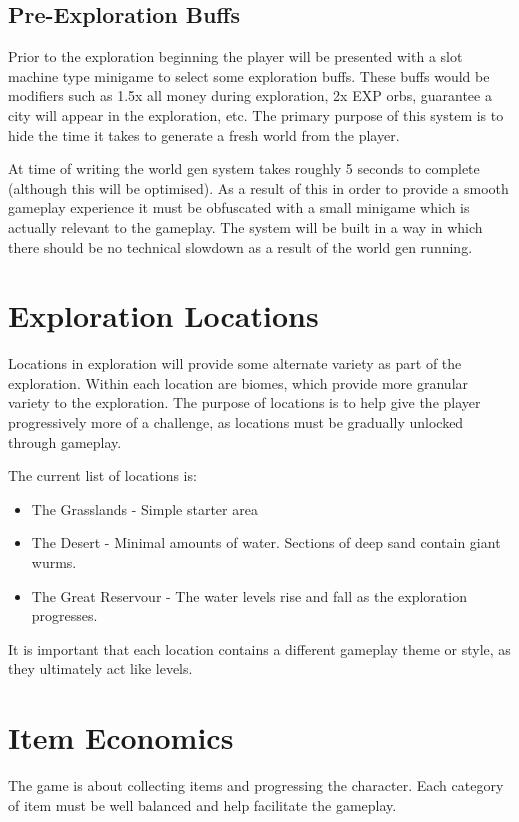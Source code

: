 \documentclass[a4paper]{scrreprt}
\begin{document}
\subsection{Pre-Exploration Buffs}
Prior to the exploration beginning the player will be presented with a slot machine type minigame to select some exploration buffs.
These buffs would be modifiers such as 1.5x all money during exploration, 2x EXP orbs, guarantee a city will appear in the exploration, etc.
The primary purpose of this system is to hide the time it takes to generate a fresh world from the player.

At time of writing the world gen system takes roughly 5 seconds to complete (although this will be optimised).
As a result of this in order to provide a smooth gameplay experience it must be obfuscated with a small minigame which is actually relevant to the gameplay.
The system will be built in a way in which there should be no technical slowdown as a result of the world gen running.

\section{Exploration Locations}
Locations in exploration will provide some alternate variety as part of the exploration.
Within each location are biomes, which provide more granular variety to the exploration.
The purpose of locations is to help give the player progressively more of a challenge, as locations must be gradually unlocked through gameplay.

The current list of locations is:

    \begin{itemize}
        \item The Grasslands - Simple starter area
        \item The Desert - Minimal amounts of water. Sections of deep sand contain giant wurms.
        \item The Great Reservour - The water levels rise and fall as the exploration progresses.
    \end{itemize}

It is important that each location contains a different gameplay theme or style, as they ultimately act like levels.

\section{Item Economics}
The game is about collecting items and progressing the character.
Each category of item must be well balanced and help facilitate the gameplay.
\end{document}
